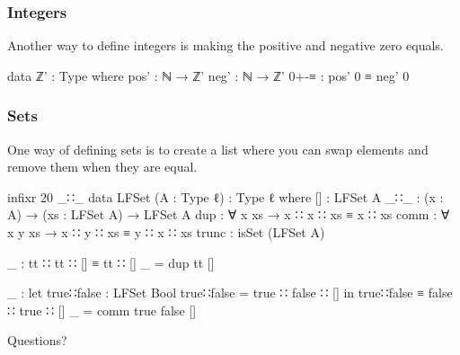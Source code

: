 \documentclass{beamer}
\begin{document}
\begin{frame}
  \frametitle{Integers}
  Another way to define integers is making the positive and negative zero equals.
  \begin{code}
  data ℤ' : Type where
    pos' : ℕ → ℤ'
    neg' : ℕ → ℤ'
    0+-≡ : pos' 0 ≡ neg' 0
  \end{code}
\end{frame}

\begin{frame}
  \frametitle{Sets}
  One way of defining sets is to create a list where you can swap elements and remove them when they are equal.
  \begin{code}
  infixr 20 _∷_
  data LFSet (A : Type ℓ) : Type ℓ where
    []    : LFSet A
    _∷_   : (x : A) → (xs : LFSet A) → LFSet A
    dup   : ∀ x xs   → x ∷ x ∷ xs ≡ x ∷ xs
    comm  : ∀ x y xs → x ∷ y ∷ xs ≡ y ∷ x ∷ xs
    trunc : isSet (LFSet A)

  _ : tt ∷ tt ∷ [] ≡ tt ∷ []
  _ = dup tt []

  _ : let true∷false : LFSet Bool
          true∷false = true ∷ false ∷ []
      in true∷false ≡ false ∷ true ∷ []
  _ = comm true false []
  \end{code}
\end{frame}

\begin{frame}
  \vspace*{36 pt}
  \begin{center}
  {\Huge Questions?}
  \end{center}
\end{frame}
\end{document}
